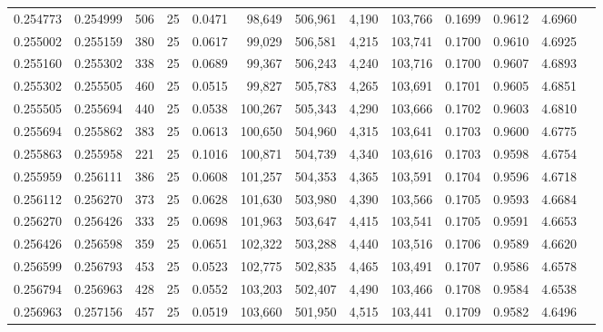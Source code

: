 \begin{tabular}{rrrrrrrrrrrrr}
0.254773 & 0.254999 &   506 &  25 &                                     0.0471 &  98,649 & 506,961 &   4,190 & 103,766 & 0.1699 & 0.9612 & 4.6960 \\
0.255002 & 0.255159 &   380 &  25 &                                     0.0617 &  99,029 & 506,581 &   4,215 & 103,741 & 0.1700 & 0.9610 & 4.6925 \\
0.255160 & 0.255302 &   338 &  25 &                                     0.0689 &  99,367 & 506,243 &   4,240 & 103,716 & 0.1700 & 0.9607 & 4.6893 \\
0.255302 & 0.255505 &   460 &  25 &                                     0.0515 &  99,827 & 505,783 &   4,265 & 103,691 & 0.1701 & 0.9605 & 4.6851 \\
0.255505 & 0.255694 &   440 &  25 &                                     0.0538 & 100,267 & 505,343 &   4,290 & 103,666 & 0.1702 & 0.9603 & 4.6810 \\
0.255694 & 0.255862 &   383 &  25 &                                     0.0613 & 100,650 & 504,960 &   4,315 & 103,641 & 0.1703 & 0.9600 & 4.6775 \\
0.255863 & 0.255958 &   221 &  25 &                                     0.1016 & 100,871 & 504,739 &   4,340 & 103,616 & 0.1703 & 0.9598 & 4.6754 \\
0.255959 & 0.256111 &   386 &  25 &                                     0.0608 & 101,257 & 504,353 &   4,365 & 103,591 & 0.1704 & 0.9596 & 4.6718 \\
0.256112 & 0.256270 &   373 &  25 &                                     0.0628 & 101,630 & 503,980 &   4,390 & 103,566 & 0.1705 & 0.9593 & 4.6684 \\
0.256270 & 0.256426 &   333 &  25 &                                     0.0698 & 101,963 & 503,647 &   4,415 & 103,541 & 0.1705 & 0.9591 & 4.6653 \\
0.256426 & 0.256598 &   359 &  25 &                                     0.0651 & 102,322 & 503,288 &   4,440 & 103,516 & 0.1706 & 0.9589 & 4.6620 \\
0.256599 & 0.256793 &   453 &  25 &                                     0.0523 & 102,775 & 502,835 &   4,465 & 103,491 & 0.1707 & 0.9586 & 4.6578 \\
0.256794 & 0.256963 &   428 &  25 &                                     0.0552 & 103,203 & 502,407 &   4,490 & 103,466 & 0.1708 & 0.9584 & 4.6538 \\
0.256963 & 0.257156 &   457 &  25 &                                     0.0519 & 103,660 & 501,950 &   4,515 & 103,441 & 0.1709 & 0.9582 & 4.6496 \\

\end{tabular}
